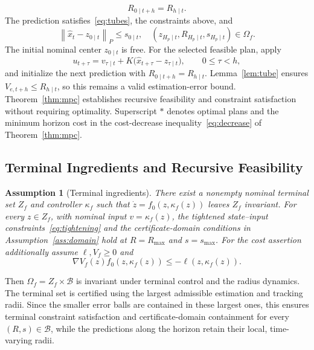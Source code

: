 \documentclass[11pt,a4paper]{article}
\numberwithin{equation}{section}
\newtheorem{assumption}{Assumption}
\theoremstyle{remark}\newtheorem{remark}{Remark}
\newcommand{\norm}[1]{\left\lVert#1\right\rVert}
\begin{document}
\begin{equation}\label{eq:radius-update}
R_{0\mid t+h}=R_{h\mid t}.
\end{equation} The prediction satisfies~\eqref{eq:tubes}, the constraints above, and
\begin{equation}\label{eq:init}
\norm{\hat x_t-z_{0\mid t}}_P\le s_{0\mid t},\quad
(z_{H_p\mid t},R_{H_p\mid t},s_{H_p\mid t})\in\Omega_f.
\end{equation}
The initial nominal center $z_{0\mid t}$ is free. For the selected feasible plan, apply
\[
u_{t+\tau}=v_{\tau\mid t}+K\bigl(\hat x_{t+\tau}-z_{\tau\mid t}\bigr),\qquad 0\le\tau<h,
\]
and initialize the next prediction with $R_{0\mid t+h}=R_{h\mid t}$. Lemma~\ref{lem:tube} ensures $V_{e,t+h}\le R_{h\mid t}$, so this remains a valid estimation-error bound. Theorem~\ref{thm:mpc} establishes recursive feasibility and constraint satisfaction without requiring optimality. Superscript $*$ denotes optimal plans and the minimum horizon cost in the cost-decrease inequality~\eqref{eq:decrease} of Theorem~\ref{thm:mpc}.
\subsection{Terminal Ingredients and Recursive Feasibility}
\begin{assumption}[Terminal ingredients]\label{ass:terminal}
There exist a nonempty nominal terminal set $Z_f$ and controller $\kappa_f$ such that $\dot z=f_0(z,\kappa_f(z))$ leaves $Z_f$ invariant. For every $z\in Z_f$, with nominal input $v=\kappa_f(z)$, the tightened state--input constraints~\eqref{eq:tightening} and the certificate-domain conditions in Assumption~\ref{ass:domain} hold at $R=R_{\max}$ and $s=s_{\max}$. For the cost assertion additionally assume $\ell,V_f\ge0$ and
\begin{equation}\label{eq:terminalcost}
\nabla V_f(z)f_0(z,\kappa_f(z))\le-\ell(z,\kappa_f(z)).
\end{equation}
\end{assumption}
Then $\Omega_f=Z_f\times\mathcal B$ is invariant under terminal control and the radius dynamics. The terminal set is certified using the largest admissible estimation and tracking radii. Since the smaller error balls are contained in these largest ones, this ensures terminal constraint satisfaction and certificate-domain containment for every $(R,s)\in\mathcal B$, while the predictions along the horizon retain their local, time-varying radii.
\end{document}
